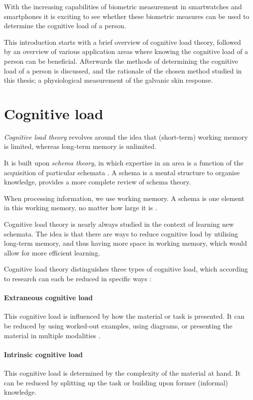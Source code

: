 \documentclass[11pt,leqno,a4paper]{report} %
\begin{document}
With the increasing capabilities of biometric measurement in smartwatches and smartphones it is exciting to see whether these biometric measures can be used to determine the cognitive load of a person.

This introduction starts with a brief overview of cognitive load theory, followed by an overview of various application areas where knowing the cognitive load of a person can be beneficial. Afterwards the methods of determining the cognitive load of a person is discussed, and the rationale of the chosen method studied in this thesis; a physiological measurement of the galvanic skin response.

\section{Cognitive load}
\emph{Cognitive load theory} \citep{Oviatt2004} revolves around the idea that (short-term) working memory is limited, whereas long-term memory is unlimited. 

It is built upon \emph{schema theory}, in which expertise in an area is a function of the acquisition of particular schemata \citep{bartlett1995remembering}. A schema is a mental structure to organise knowledge, \citep{mcvee2005schema} provides a more complete review of schema theory.

When processing information, we use working memory. A schema is one element in this working memory, no matter how large it is \citep{mayer2014cambridge}. 

Cognitive load theory is nearly always studied in the context of learning new schemata. The idea is that there are ways to reduce cognitive load by utilising long-term memory, and thus having more space in working memory, which would allow for more efficient learning.

Cognitive load theory distinguishes three types of cognitive load, which according to research can each be reduced in specific ways \citep{mayer2002multimedia}:


\paragraph{Extraneous cognitive load}
This cognitive load is influenced by how the material or task is presented. It can be reduced by using worked-out examples, using diagrams, or presenting the material in multiple modalities \citep{mousavi1995reducing}.

\paragraph{Intrinsic cognitive load}
This cognitive load is determined by the complexity of the material at hand. It can be reduced by splitting up the task or building upon former (informal) knowledge.
\end{document}
